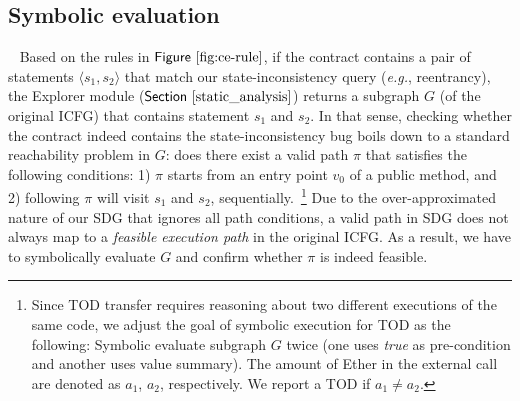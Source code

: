 \documentclass[conference, romanappendices]{tex/IEEEtran}
\theoremstyle{bfnote}
\newcommand{\explorer}{{\sc Explorer}\xspace}
\newcommand{\ether}{{Ether}\xspace}
\newcommand{\reentrancy}{{reentrancy}\xspace}
\newcommand{\si}{{state-inconsistency}\xspace}
\newcommand{\eg}{\textit{e.g.}}
\newcommand{\Fig}[1]{\ensuremath{\sf Figure~\ref{#1}}}
\newcommand{\Sect}[1]{\ensuremath{\sf Section~\ref{#1}}}
\begin{document}
 \subsection{\textbf{Symbolic evaluation}}
~\label{sec:sym-exe}
Based on the rules in \Fig{fig:ce-rule}, if the contract contains a pair of statements $\langle s_1, s_2 \rangle$ that match our \si query (\eg, \reentrancy), the \explorer module (\Sect{static_analysis}) returns a subgraph $G$ (of the original ICFG) that contains statement $s_1$ and $s_2$. 
In that sense, checking whether the contract indeed contains the \si bug boils down to a standard reachability problem in $G$: does there exist a valid path $\pi$ that satisfies the following conditions: 1) $\pi$ starts from an entry point $v_0$ of a public method, and 2) following $\pi$ will visit $s_1$ and $s_2$, sequentially.~\footnote{Since TOD transfer requires reasoning about two different executions of the same code, we adjust the goal of symbolic execution for TOD as the following: Symbolic evaluate subgraph $G$ twice (one uses \textit{true} as pre-condition and another uses value summary). The amount of \ether in the external call are denoted as $a_1$, $a_2$, respectively. We report a TOD if $a_1 \neq a_2$. }
Due to the over-approximated nature of our SDG that ignores all path conditions, a valid path in SDG does not always map to a \emph{feasible execution path} in the original ICFG. As a result, we have to symbolically evaluate $G$ and confirm whether $\pi$ is indeed feasible.
\end{document}
